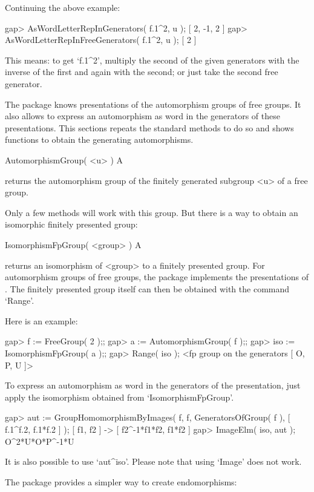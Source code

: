 Continuing the above example:

\beginexample
gap> AsWordLetterRepInGenerators( f.1^2, u );    
[ 2, -1, 2 ]
gap> AsWordLetterRepInFreeGenerators( f.1^2, u );
[ 2 ]
\endexample

This means: to get `f.1^2', multiply the second of the given generators
with the inverse of the first and again with the second; or just take
the second free generator.


The {\FGA} package knows presentations of the automorphism groups of free
groups. It also allows to express an automorphism as word in the
generators of these presentations.
This sections repeats the {\GAP} standard methods to do so and shows
functions to obtain the generating automorphisms.

\>AutomorphismGroup( <u> ) A

returns the automorphism group of the finitely generated subgroup <u>
of a free group.

Only a few methods will work with this group. But there is a way to
obtain an isomorphic finitely presented group:

\>IsomorphismFpGroup( <group> ) A

returns an isomorphism of <group> to a finitely presented group.  
For automorphism groups of free groups, the {\FGA} package implements
the presentations of \cite{Neumann33}.
The finitely presented group itself can then be obtained with the
command `Range'.

Here is an example:

\beginexample
gap> f := FreeGroup( 2 );;
gap> a := AutomorphismGroup( f );;
gap> iso := IsomorphismFpGroup( a );;
gap> Range( iso );
<fp group on the generators [ O, P, U ]>
\endexample

To express an automorphism as word in the generators of the
presentation, just apply the isomorphism obtained from
`IsomorphismFpGroup'.

\beginexample
gap> aut := GroupHomomorphismByImages( f, f,
               GeneratorsOfGroup( f ), [ f.1^f.2, f.1*f.2 ] );
[ f1, f2 ] -> [ f2^-1*f1*f2, f1*f2 ]
gap> ImageElm( iso, aut );
O^2*U*O*P^-1*U
\endexample

It is also possible to use `aut^iso'.
Please note that using `Image' does not work.

The {\FGA} package provides a simpler way to create endomorphisms:

